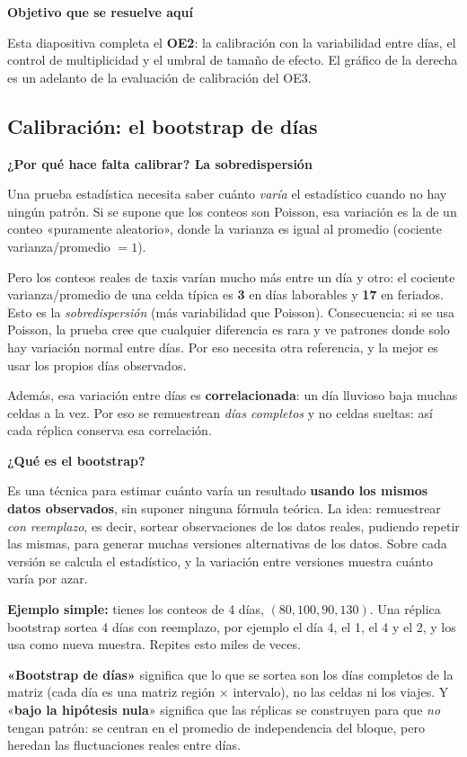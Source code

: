 \documentclass[11pt,a4paper]{article}
\newcommand{\cajainicio}[3]{\par\medskip\noindent
  \begin{lrbox}{\cajabox}\begin{minipage}{\dimexpr\linewidth-2\fboxsep-2\fboxrule\relax}%
  \textbf{\color{#1}#3}\par\smallskip}
\newcommand{\cajafin}[2]{\end{minipage}\end{lrbox}\fcolorbox{#1}{#2}{\usebox{\cajabox}}\par\medskip}
\newenvironment{nota}[1]{\cajainicio{acc}{acc!7}{#1}}{\cajafin{acc}{acc!7}}
\begin{document}
\begin{nota}{Objetivo que se resuelve aquí}
Esta diapositiva completa el \textbf{OE2}: la calibración con la variabilidad entre días, el control de multiplicidad y el umbral de tamaño de efecto. El gráfico de la derecha es un adelanto de la evaluación de calibración del OE3.
\end{nota}

\subsection*{Calibración: el bootstrap de días}

\begin{nota}{¿Por qué hace falta calibrar? La sobredispersión}
Una prueba estadística necesita saber cuánto \emph{varía} el estadístico cuando no hay ningún patrón. Si se supone que los conteos son Poisson, esa variación es la de un conteo «puramente aleatorio», donde la varianza es igual al promedio (cociente varianza/promedio $=1$).

Pero los conteos reales de taxis varían mucho más entre un día y otro: el cociente varianza/promedio de una celda típica es \textbf{3} en días laborables y \textbf{17} en feriados. Esto es la \emph{sobredispersión} (más variabilidad que Poisson). Consecuencia: si se usa Poisson, la prueba cree que cualquier diferencia es rara y ve patrones donde solo hay variación normal entre días. Por eso necesita otra referencia, y la mejor es usar los propios días observados.

Además, esa variación entre días es \textbf{correlacionada}: un día lluvioso baja muchas celdas a la vez. Por eso se remuestrean \emph{días completos} y no celdas sueltas: así cada réplica conserva esa correlación.
\end{nota}

\begin{nota}{¿Qué es el bootstrap?}
Es una técnica para estimar cuánto varía un resultado \textbf{usando los mismos datos observados}, sin suponer ninguna fórmula teórica. La idea: remuestrear \emph{con reemplazo}, es decir, sortear observaciones de los datos reales, pudiendo repetir las mismas, para generar muchas versiones alternativas de los datos. Sobre cada versión se calcula el estadístico, y la variación entre versiones muestra cuánto varía por azar.

\textbf{Ejemplo simple:} tienes los conteos de 4 días, $(80, 100, 90, 130)$. Una réplica bootstrap sortea 4 días con reemplazo, por ejemplo el día 4, el 1, el 4 y el 2, y los usa como nueva muestra. Repites esto miles de veces.

\textbf{«Bootstrap de días»} significa que lo que se sortea son los días completos de la matriz (cada día es una matriz región $\times$ intervalo), no las celdas ni los viajes. Y «\textbf{bajo la hipótesis nula}» significa que las réplicas se construyen para que \emph{no} tengan patrón: se centran en el promedio de independencia del bloque, pero heredan las fluctuaciones reales entre días.
\end{nota}
\end{document}
